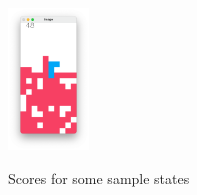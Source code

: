 \documentclass[letterpaper]{article} %
\begin{document}
\begin{figure}[h!]
{    \includegraphics[width=0.19\textwidth]{figures/example5.png}
    }\hfill
    \caption{Scores for some sample states}
  \end{figure}


\newpage
\end{document}
